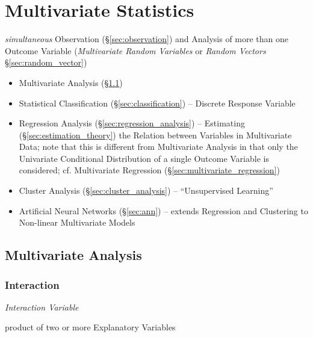 \section{Multivariate Statistics}\label{sec:multivariate_statistics}

\emph{simultaneous} Observation (\S\ref{sec:observation}) and Analysis of more
than one Outcome Variable (\emph{Multivariate Random Variables} or \emph{Random
  Vectors} \S\ref{sec:random_vector})

\begin{itemize}
  \item Multivariate Analysis (\S\ref{sec:multivariate_analysis})
  \item Statistical Classification (\S\ref{sec:classification})
    -- Discrete Response Variable
  \item Regression Analysis (\S\ref{sec:regression_analysis}) -- Estimating
    (\S\ref{sec:estimation_theory}) the Relation between Variables in
    Multivariate Data; note that this is different from Multivariate Analysis in
    that only the Univariate Conditional Distribution of a single Outcome
    Variable is considered; cf. Multivariate Regression
    (\S\ref{sec:multivariate_regression})
  \item Cluster Analysis (\S\ref{sec:cluster_analysis}) --
    ``Unsupervised Learning''
  \item Artificial Neural Networks (\S\ref{sec:ann}) -- extends Regression and
    Clustering to Non-linear Multivariate Models
\end{itemize}



\subsection{Multivariate Analysis}\label{sec:multivariate_analysis}

\subsubsection{Interaction}\label{sec:interaction}

\emph{Interaction Variable}

product of two or more Explanatory Variables

